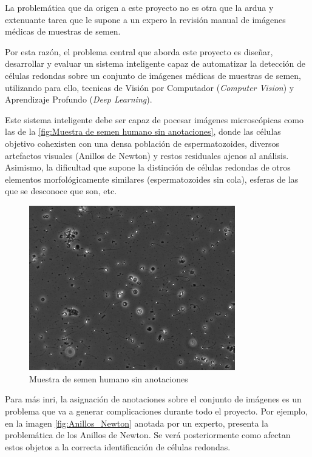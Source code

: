 \documentclass[12pt,a4paper,onecolumn,oneside]{report}
\begin{document}
La problemática que da origen a este proyecto no es otra que la ardua y extenuante tarea que le supone a un expero la revisión manual de imágenes médicas de muestras de semen.

Por esta razón, el problema central que aborda este proyecto es diseñar, desarrollar y evaluar un sistema inteligente capaz de automatizar la detección de células 
redondas sobre un conjunto de imágenes médicas de muestras de semen, utilizando para ello, tecnicas de Visión por Computador (\textit{Computer Vision}) y Aprendizaje Profundo (\textit{Deep Learning}).

Este sistema inteligente debe ser capaz de pocesar imágenes microscópicas como las de la \autoref{fig:Muestra de semen humano sin anotaciones}, donde las células objetivo cohexisten con una densa población de espermatozoides, diversos artefactos visuales (Anillos de Newton)
y restos residuales ajenos al análisis. Asimismo, la dificultad que supone la distinción de células redondas de otros elementos morfológicamente similares (espermatozoides sin cola), esferas de las que se desconoce que son, etc.

\begin{figure}[H]
  \centering
  \includegraphics[width=0.8\textwidth]{figuras/rounds_cells/61.jpg}
  \caption{Muestra de semen humano sin anotaciones}
  \label{fig:Muestra de semen humano sin anotaciones}
\end{figure}

Para más inri, la asignación de anotaciones sobre el conjunto de imágenes es un problema que va a generar complicaciones durante todo el proyecto. Por ejemplo,
en la imagen \ref{fig:Anillos_Newton} anotada por un experto, presenta la problemática de los Anillos de Newton. Se verá posteriormente como afectan estos objetos a la correcta identificación de células redondas.
\end{document}
